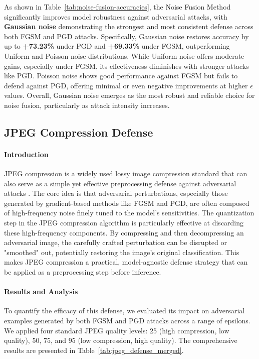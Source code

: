 \documentclass[../main.tex]{subfiles}
\begin{document}
\clearpage
As shown in Table~\ref{tab:noise-fusion-accuracies}, the Noise Fusion Method significantly improves model robustness against adversarial attacks, with \textbf{Gaussian noise} demonstrating the strongest and most consistent defense across both FGSM and PGD attacks. Specifically, Gaussian noise restores accuracy by up to \textbf{+73.23\%} under PGD and \textbf{+69.33\%} under FGSM, outperforming Uniform and Poisson noise distributions. While Uniform noise offers moderate gains, especially under FGSM, its effectiveness diminishes with stronger attacks like PGD. Poisson noise shows good performance against FGSM but fails to defend against PGD, offering minimal or even negative improvements at higher $\epsilon$ values. Overall, Gaussian noise emerges as the most robust and reliable choice for noise fusion, particularly as attack intensity increases.


\subsection{JPEG Compression Defense}
\label{sec:jpeg_defense}

\paragraph{Introduction}
JPEG compression is a widely used lossy image compression standard that can also serve as a simple yet effective preprocessing defense against adversarial attacks \cite{das2017keepingbadguysout}. The core idea is that adversarial perturbations, especially those generated by gradient-based methods like FGSM and PGD, are often composed of high-frequency noise finely tuned to the model's sensitivities. The quantization step in the JPEG compression algorithm is particularly effective at discarding these high-frequency components. By compressing and then decompressing an adversarial image, the carefully crafted perturbation can be disrupted or "smoothed" out, potentially restoring the image's original classification. This makes JPEG compression a practical, model-agnostic defense strategy that can be applied as a preprocessing step before inference.

\paragraph{Results and Analysis}
To quantify the efficacy of this defense, we evaluated its impact on adversarial examples generated by both FGSM and PGD attacks across a range of epsilons. We applied four standard JPEG quality levels: 25 (high compression, low quality), 50, 75, and 95 (low compression, high quality). The comprehensive results are presented in Table~\ref{tab:jpeg_defense_merged}.
\end{document}
